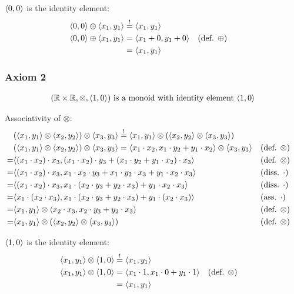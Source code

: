 \documentclass[a4paper,12pt]{ETHexercise}
\begin{document}
$\langle0, 0\rangle$ is the identity element:
\begin{align}
    \langle0, 0\rangle \oplus \langle x_1, y_1\rangle &\stackrel{!}{=} \langle x_1, y_1\rangle\\
    \langle0, 0\rangle \oplus \langle x_1, y_1\rangle &= \langle x_1+0, y_1+0\rangle &&(\text{def. } \oplus)\\
    &=  \langle x_1, y_1\rangle
\end{align}

\subsubsection*{Axiom 2}
\begin{align*}
    (\mathbb{R} \times \mathbb{R}, \otimes, \langle1, 0\rangle) \text{ is a monoid with identity element } \langle1, 0\rangle
\end{align*}

Associativity of $\otimes$:
\begin{align}
    &(\langle x_1, y_1\rangle \otimes \langle x_2, y_2\rangle) \otimes \langle x_3, y_3\rangle \stackrel{!}{=} \langle x_1, y_1\rangle \otimes (\langle x_2, y_2\rangle \otimes \langle x_3, y_3\rangle)\\
    &(\langle x_1, y_1\rangle \otimes \langle x_2, y_2\rangle) \otimes \langle x_3, y_3\rangle =
    \langle x_1 \cdot x_2, x_1 \cdot y_2 + y_1 \cdot x_2\rangle \otimes \langle x_3, y_3\rangle &&(\text{def. } \otimes)\\
    =  &\langle(x_1 \cdot x_2) \cdot x_3, (x_1 \cdot x_2) \cdot y_3 + (x_1 \cdot y_2 + y_1 \cdot x_2) \cdot x_3\rangle &&(\text{def. } \otimes)\\
    =  &\langle(x_1 \cdot x_2) \cdot x_3, x_1 \cdot x_2 \cdot y_3 + x_1 \cdot y_2 \cdot x_3 + y_1 \cdot x_2 \cdot x_3 \rangle &&(\text{diss. } \cdot)\\ 
    =  &\langle(x_1 \cdot x_2) \cdot x_3, x_1 \cdot (x_2 \cdot y_3 + y_2 \cdot x_3) + y_1 \cdot x_2 \cdot x_3 \rangle &&(\text{diss. } \cdot)\\
    =  &\langle x_1 \cdot( x_2 \cdot x_3), x_1 \cdot (x_2 \cdot y_3 + y_2 \cdot x_3) + y_1 \cdot (x_2 \cdot x_3) \rangle &&(\text{ass. } \cdot)\\
    =  &\langle x_1, y_1\rangle \otimes \langle x_2 \cdot x_3, x_2 \cdot y_3 + y_2 \cdot x_3\rangle &&(\text{def. } \otimes)\\
    =  &\langle x_1, y_1\rangle \otimes (\langle x_2, y_2\rangle \otimes \langle x_3, y_3\rangle) &&(\text{def. } \otimes)
\end{align}


$\langle1, 0\rangle$ is the identity element:
\begin{align}
    \langle x_1, y_1\rangle \otimes \langle1, 0\rangle &\stackrel{!}{=} \langle x_1, y_1\rangle\\
    \langle x_1, y_1\rangle \otimes \langle1, 0\rangle &= \langle x_1 \cdot 1, x_1 \cdot 0 + y_1 \cdot 1\rangle &&(\text{def. } \otimes)\\
    &=  \langle x_1, y_1\rangle
\end{align}
\end{document}
